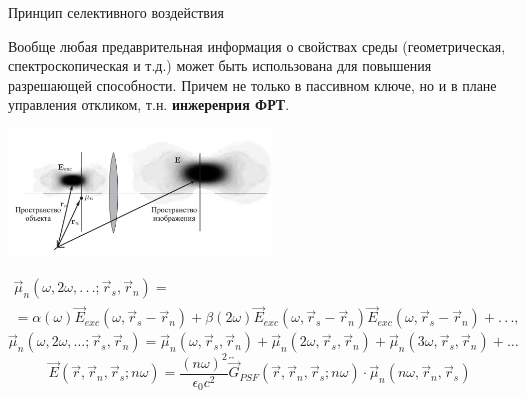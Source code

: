 \documentclass[9pt, compress, xcolor=table]{beamer}
\begin{document}
\begin{frame}{Принцип селективного воздействия}

{\small Вообще любая предаврительная информация о свойствах среды (геометрическая, спектроскопическая и т.д.) может быть использована для повышения разрешающей способности. Причем не только в пассивном ключе, но и в плане управления откликом, т.н. \textcolor{red!50!black}{\textbf{инжеренрия ФРТ}}.}

\begin{center}
\includegraphics[width=7cm]{fig4_04}
\end{center}
\begin{multline*}
\vec \mu_n (\omega, 2\omega, .\,.\,.; \vec r_s, \vec r_n) = \\=\alpha (\omega) \vec E_{exc}
(\omega, \vec r_s - \vec r_n) + \beta (2\omega) \vec E_{exc} (\omega, \vec r_s - \vec
r_n)\vec E_{exc} (\omega, \vec r_s - \vec r_n) + .\,.\,.,
\end{multline*}
\begin{equation*}
\vec \mu_n (\omega, 2\omega, \ldots; \vec r_s, \vec r_n) = \vec \mu_n (\omega, \vec r_s, \vec r_n)
+ \vec \mu_n (2\omega, \vec r_s, \vec r_n) + \vec \mu_n (3\omega, \vec r_s, \vec r_n) + \ldots
\end{equation*}
\begin{equation*}
\vec E(\vec r, \vec r_n, \vec r_s; n\omega) = \frac{(n \omega)^2}{\epsilon_0 c^2} \overleftrightarrow{\vec G}_{PSF}(\vec r, \vec r_n, \vec r_s; n\omega)
\cdot \vec \mu_n (n\omega, \vec r_n, \vec r_s)
\end{equation*}

\end{frame}

\end{document}
